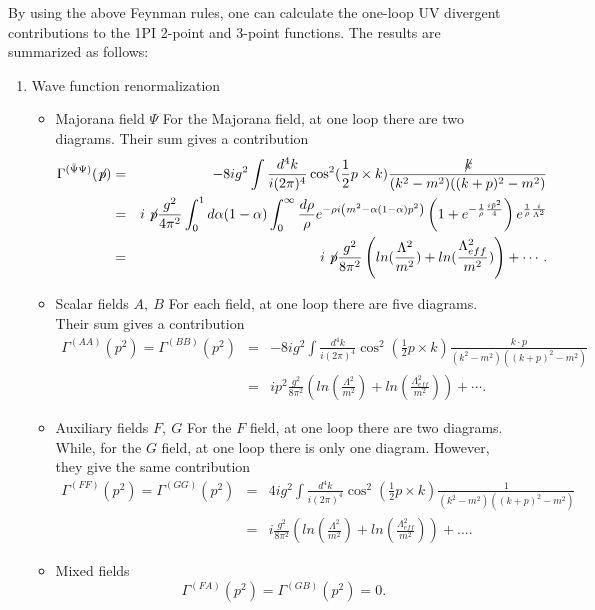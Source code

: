 \documentclass[a4paper,a4paper]{article}
\begin{document}
By using the above Feynman rules, one can calculate the one-loop UV divergent contributions 
to the 1PI 2-point and 3-point functions. The results are summarized as follows: 
\begin{enumerate}
\item Wave function renormalization
\begin{itemize}
\item Majorana field $\Psi$\newline
For the Majorana field, at one loop there are two diagrams. 
Their sum gives a contribution
\begin{eqnarray}
\Gamma^{(\bar{\Psi}\Psi)}(\not\negthinspace p) &=& -8ig^2\int \frac{d^4k}{i(2\pi)^4}
\cos^2(\frac 12 p\times k)\frac{\not\negthinspace k}{(k^2-m^2)((k+p)^2-m^2)}\nonumber\\
&=& i\not\negthinspace p\frac{g^2}{4\pi^2}\int_0^1d\alpha(1-\alpha)
\int_0^{\infty}\frac{d\rho}{\rho}e^{-\rho i\left(m^2-\alpha(1-\alpha)p^2\right)}
\left(1+e^{-\frac 1\rho\frac{i\tilde{p}^2}{4}}\right)e^{\frac 1\rho\frac {i}{\Lambda^2}}\nonumber\\
&=& i\not\negthinspace p\frac{g^2}{8\pi^2}\left(ln(\frac {\Lambda^2}{m^2})+
ln(\frac {\Lambda_{eff}^2}{m^2})\right)+\cdots.
\end{eqnarray}
\item Scalar fields $A,~B$ \newline
For each field, at one loop there are five diagrams. 
Their sum gives a contribution
\begin{eqnarray}
\Gamma^{(AA)}(p^2) = \Gamma^{(BB)}(p^2) &=& -8ig^2\int \frac{d^4k}{i(2\pi)^4}
\cos^2(\frac 12 p\times k)\frac{k\cdot p}{(k^2-m^2)((k+p)^2-m^2)}\nonumber\\
&=& ip^2\frac{g^2}{8\pi^2}\left(ln(\frac {\Lambda^2}{m^2})+
ln(\frac {\Lambda_{eff}^2}{m^2})\right)+\cdots.
\end{eqnarray}
\item Auxiliary fields $F,~G$ \newline
For the $F$ field, at one loop there are two diagrams. While, for the $G$ field, at 
one loop there is only one diagram. However, they give the same contribution
\begin{eqnarray}
\Gamma^{(FF)}(p^2) = \Gamma^{(GG)}(p^2) &=& 4ig^2\int \frac{d^4k}{i(2\pi)^4}
\cos^2(\frac 12 p\times k)\frac{1}{(k^2-m^2)((k+p)^2-m^2)} \nonumber\\
&=& i\frac{g^2}{8\pi^2}\left(ln(\frac {\Lambda^2}{m^2})+
ln(\frac {\Lambda_{eff}^2}{m^2})\right)+\dots.
\end{eqnarray}
\item Mixed fields
\begin{equation}
\Gamma^{(FA)}(p^2) = \Gamma^{(GB)}(p^2) = 0.
\end{equation}
\end{itemize}


\end{enumerate}
\end{document}
